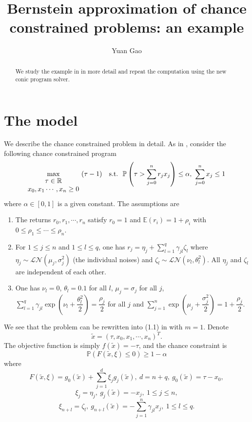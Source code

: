 \documentclass[11pt]{article}
\title{Bernstein approximation of chance constrained problems: an example}
\author{Yuan Gao}
\begin{document}
\maketitle

\begin{abstract}
We study the example in\cite{Nemirovsky_and_Shapiro} in more detail and repeat the computation using the new conic program solver.
\end{abstract}

\section*{The model}
We describe the chance constrained problem in detail. As in \cite{Nemirovsky_and_Shapiro}, consider the following chance constrained program
\begin{align} \label{investment_problem}
\max_{\begin{matrix}
	\tau \in \mathbb{R}\\ 	
	x_0, x_1\cdots,x_n \geq 0
	\end{matrix}}\ (\tau - 1)\ \ \ \textnormal{s.t.}\ \ \mathbb{P} \left(\tau > \sum_{j=0}^n r_j x_j \right) \leq \alpha,\ \sum_{j=0}^{n} x_j \leq 1
\end{align}
where $\alpha \in [0,1]$ is a given constant. The assumptions are 
\begin{enumerate}
	\item The returns $r_0, r_1, \cdots, r_n$ satisfy $r_0=1$ and $\mathbb{E}(r_i) = 1 + \rho_i$ with $0\leq \rho_1 \leq \cdots \leq \rho_n$.
	\item For $1\leq j \leq n$ and $1\leq l \leq q$, one has $r_j = \eta_j + \sum_{l=1}^q \gamma_{jl}\zeta_l$ where $\eta_j \sim \mathcal{LN}(\mu_j, \sigma_j^2)$ (the individual noises) and $\zeta_l \sim \mathcal{LN}(\nu_l, \theta_l^2)$. All $\eta_j$ and $\zeta_l$ are independent of each other.
	\item One has $\nu_l = 0$, $\theta_l=0.1$ for all $l$, $\mu_j = \sigma_j$ for all $j$, $\sum_{l=1}^q \gamma_{jl} \exp \left(\nu_l + \dfrac{\theta_l^2}{2}\right) = \dfrac{\rho_j}{2}$ for all $j$ and $\sum_{j=1}^n \exp\left(\mu_j + \dfrac{\sigma_j^2}{2}\right) = 1 + \dfrac{\rho_j}{2}$.
\end{enumerate}
We see that the problem can be rewritten into (1.1) in \cite{Nemirovsky_and_Shapiro} with $m=1$. Denote \[\tilde{x} = (\tau, x_0, x_1, \cdots, x_n)^T.\] The objective function is simply $f(\tilde{x}) = -\tau$, and the chance constraint is \[\mathbb{P}\left(F(\tilde{x}, \xi) \leq 0 \right) \geq 1-\alpha\] where \[F(\tilde{x},\xi) =g_0(\tilde{x}) + \sum_{j=1}^d \xi_j g_j(\tilde{x}),\ d = n+q,\ g_0(\tilde{x}) = \tau - x_0,\]
\[\xi_j = \eta_j,\ g_j(\tilde{x}) = -x_j,\ 1\leq j \leq n,\] \[\xi_{n+l} = \zeta_l,\ g_{n+l}(\tilde{x}) = -\sum_{j=1}^n \gamma_{jl}x_j,\ 1\leq l \leq q.\]
\end{document}
